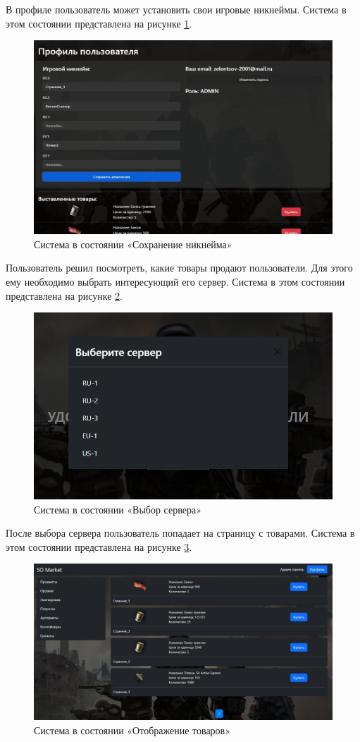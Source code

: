 В профиле пользователь может установить свои игровые никнеймы. Система в этом состоянии представлена на рисунке \ref{fig:profilechangeweb}.

\begin{figure}[ht]
	\centering
	\includegraphics[width=0.7\linewidth]{images/profile_change_web}
	\caption{Система в состоянии «Сохранение никнейма»}
	\label{fig:profilechangeweb}
\end{figure}

Пользователь решил посмотреть, какие товары продают пользователи. Для этого ему необходимо выбрать интересующий его сервер. Система в этом состоянии представлена на рисунке \ref{fig:serverweb}.

\begin{figure}[ht]
	\centering
	\includegraphics[width=0.7\linewidth]{images/server_web}
	\caption{Система в состоянии «Выбор сервера»}
	\label{fig:serverweb}
\end{figure}

После выбора сервера пользователь попадает на страницу с товарами. Система в этом состоянии представлена на рисунке \ref{fig:shopweb}.

\begin{figure}[ht]
	\centering
	\includegraphics[width=0.7\linewidth]{images/shop_web}
	\caption{Система в состоянии «Отображение товаров»}
	\label{fig:shopweb}
\end{figure}

